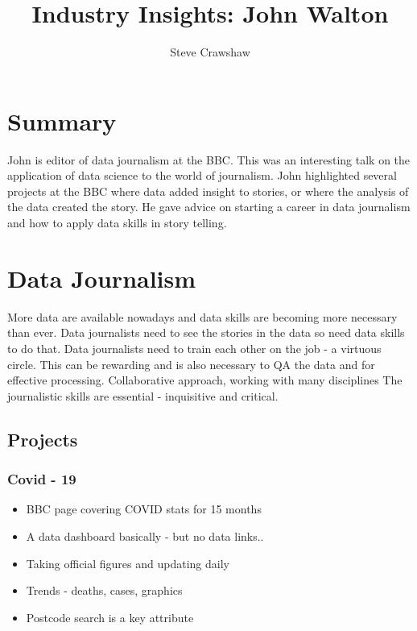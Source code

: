 \documentclass[
  letterpaper,
  DIV=11,
  numbers=noendperiod]{scrartcl}
\title{Industry Insights: John Walton}
\author{Steve Crawshaw}
\date{}
\providecommand{\tightlist}{%
  \setlength{\itemsep}{0pt}\setlength{\parskip}{0pt}}
\begin{document}
\maketitle

\ifdefined\Shaded\renewenvironment{Shaded}{\begin{tcolorbox}[enhanced, borderline west={3pt}{0pt}{shadecolor}, breakable, sharp corners, frame hidden, boxrule=0pt, interior hidden]}{\end{tcolorbox}}\fi

\hypertarget{summary}{%
\section{Summary}\label{summary}}

John is editor of data journalism at the BBC. This was an interesting
talk on the application of data science to the world of journalism. John
highlighted several projects at the BBC where data added insight to
stories, or where the analysis of the data created the story. He gave
advice on starting a career in data journalism and how to apply data
skills in story telling.

\hypertarget{data-journalism}{%
\section{Data Journalism}\label{data-journalism}}

More data are available nowadays and data skills are becoming more
necessary than ever. Data journalists need to see the stories in the
data so need data skills to do that. Data journalists need to train each
other on the job - a virtuous circle. This can be rewarding and is also
necessary to QA the data and for effective processing. Collaborative
approach, working with many disciplines The journalistic skills are
essential - inquisitive and critical.

\hypertarget{projects}{%
\subsection{Projects}\label{projects}}

\hypertarget{covid---19}{%
\subsubsection{Covid - 19}\label{covid---19}}

\begin{itemize}
\tightlist
\item
  BBC page covering COVID stats for 15 months
\item
  A data dashboard basically - but no data links..
\item
  Taking official figures and updating daily
\item
  Trends - deaths, cases, graphics
\item
  Postcode search is a key attribute
\end{itemize}
\end{document}
